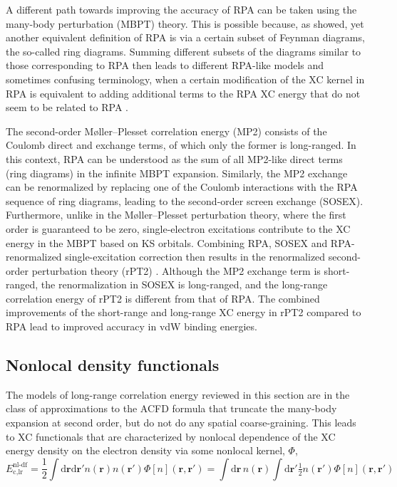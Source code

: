 A different path towards improving the accuracy of RPA can be taken using the many-body perturbation (MBPT) theory.
This is possible because, as \citet{Gell-MannPR57} showed, yet another equivalent definition of RPA is via a certain subset of Feynman diagrams, the so-called ring diagrams.
Summing different subsets of the diagrams similar to those corresponding to RPA then leads to different RPA-like models and sometimes confusing terminology, when a certain modification of the XC kernel in RPA is equivalent to adding additional terms to the RPA XC energy that do not seem to be related to RPA \citep{ScuseriaJCP08,JansenJCP10,AngyanJCTC11}.

The second-order Møller--Plesset correlation energy (MP2) consists of the Coulomb direct and exchange terms, of which only the former is long-ranged.
In this context, RPA can be understood as the sum of all MP2-like direct terms (ring diagrams) in the infinite MBPT expansion.
Similarly, the MP2 exchange can be renormalized by replacing one of the Coulomb interactions with the RPA sequence of ring diagrams, leading to the second-order screen exchange (SOSEX).
Furthermore, unlike in the Møller--Plesset perturbation theory, where the first order is guaranteed to be zero, single-electron excitations contribute to the XC energy in the MBPT based on KS orbitals.
Combining RPA, SOSEX and RPA-renormalized single-excitation correction then results in the renormalized second-order perturbation theory (rPT2) \citep{RenPRL11,RenPRB13}.
Although the MP2 exchange term is short-ranged, the renormalization in SOSEX is long-ranged, and the long-range correlation energy of rPT2 is different from that of RPA\@.
The combined improvements of the short-range and long-range XC energy in rPT2 compared to RPA lead to improved accuracy in vdW binding energies.

\subsection{Nonlocal density functionals}\label{sec:vdwdf}

The models of long-range correlation energy reviewed in this section are in the class of approximations to the ACFD formula that truncate the many-body expansion at second order, but do not do any spatial coarse-graining.
This leads to XC functionals that are characterized by nonlocal dependence of the XC energy density on the electron density via some nonlocal kernel, $\Phi$,
\begin{equation}
  E_\text{c,lr}^\text{nl-df}=\frac12\int\mathrm d\mathbf r\mathrm d\mathbf r'n(\mathbf r)n(\mathbf r')\Phi[n](\mathbf r,\mathbf r')=\int\mathrm d\mathbf r\,n(\mathbf r)\int\mathrm d\mathbf r'\tfrac12 n(\mathbf r')\Phi[n](\mathbf r,\mathbf r')
  \label{eq:nldf}
\end{equation}

